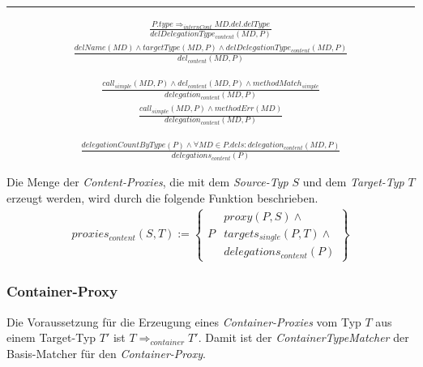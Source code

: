\hrule


\begin{gather*}
\frac{\mathit{P.type} \Rightarrow_{internCont} \mathit{MD.del.delType}}
{\mathit{delDelegationType_{content}(MD,P)}}
\end{gather*}
\begin{gather*}
\frac{\mathit{delName(MD)} \wedge \mathit{targetType(MD,P) \wedge \mathit{delDelegationType_{content}(MD,P)}}}
{\mathit{del_{content}(MD,P)}}
\end{gather*}

\begin{gather*}
\frac{\mathit{call_{simple}(MD, P)} \wedge \mathit{del_{content}(MD, P)} \wedge \mathit{methodMatch_{simple}}}
{\mathit{delegation_{content}(MD, P)}}
\end{gather*}
\begin{gather*}
\frac{\mathit{call_{simple}(MD, P)} \wedge \mathit{methodErr(MD)}}
{\mathit{delegation_{content}(MD, P)}}
\end{gather*}

\begin{gather*}
\frac{\mathit{delegationCountByType(P)} \wedge \forall \mathit{MD} \in P.dels: \mathit{delegation_{content}(MD,P)}}
{\mathit{delegations_{content}(P)}}
\end{gather*}

Die Menge der \emph{Content-Proxies}, die mit dem \emph{Source-Typ} $S$ und dem \emph{Target-Typ} $T$ erzeugt werden, wird durch die folgende Funktion beschrieben.
\begin{gather*}
\mathit{proxies_{content}(S,T)} := 
\left\{\begin{array}{l|l}
		& \mathit{proxy(P,S)} \wedge \mathit{ } \\
	P	& \mathit{targets_{single}(P,T)} \wedge \mathit{ }\\
		& \mathit{delegations_{content}(P)} 
		 \end{array}
\right\}
\end{gather*}
\subsubsection{Container-Proxy}
Die Voraussetzung für die Erzeugung eines \emph{Container-Proxies} vom Typ $T$ aus einem Target-Typ $T'$ ist $T \Rightarrow_{container} T'$. Damit ist der \emph{ContainerTypeMatcher} der Basis-Matcher für den \emph{Container-Proxy}.
